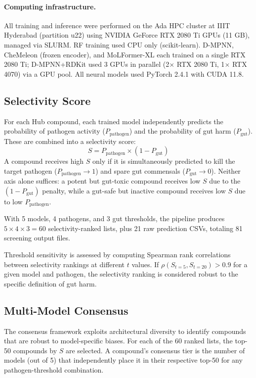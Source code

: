 \documentclass{article}
\newcommand{\pp}{P_{\mathrm{pathogen}}}
\newcommand{\pg}{P_{\mathrm{gut}}}
\begin{document}
\paragraph{Computing infrastructure.}
All training and inference were performed on the Ada HPC cluster at IIIT Hyderabad (partition u22) using NVIDIA GeForce RTX 2080 Ti GPUs (11 GB), managed via SLURM.
RF training used CPU only (scikit-learn).
D-MPNN, CheMeleon (frozen encoder), and MoLFormer-XL each trained on a single RTX 2080 Ti; D-MPNN+RDKit used 3 GPUs in parallel (2$\times$ RTX 2080 Ti, 1$\times$ RTX 4070) via a GPU pool.
All neural models used PyTorch 2.4.1 with CUDA 11.8.

\subsection{Selectivity Score}
\label{sec:selectivity}

For each Hub compound, each trained model independently predicts the probability of pathogen activity ($\pp$) and the probability of gut harm ($\pg$).
These are combined into a selectivity score:
\begin{equation}
S = \pp \times (1 - \pg)
\label{eq:selectivity}
\end{equation}
A compound receives high $S$ only if it is simultaneously predicted to kill the target pathogen ($\pp \to 1$) and spare gut commensals ($\pg \to 0$).
Neither axis alone suffices: a potent but gut-toxic compound receives low $S$ due to the $(1 - \pg)$ penalty, while a gut-safe but inactive compound receives low $S$ due to low $\pp$.

With 5 models, 4 pathogens, and 3 gut thresholds, the pipeline produces $5 \times 4 \times 3 = 60$ selectivity-ranked lists, plus 21 raw prediction CSVs, totaling 81 screening output files.

Threshold sensitivity is assessed by computing Spearman rank correlations between selectivity rankings at different $t$ values.
If $\rho(S_{t{=}5}, S_{t{=}20}) > 0.9$ for a given model and pathogen, the selectivity ranking is considered robust to the specific definition of gut harm.

\subsection{Multi-Model Consensus}
\label{sec:consensus}

The consensus framework exploits architectural diversity to identify compounds that are robust to model-specific biases.
For each of the 60 ranked lists, the top-50 compounds by $S$ are selected.
A compound's consensus tier is the number of models (out of 5) that independently place it in their respective top-50 for any pathogen-threshold combination.
\end{document}
